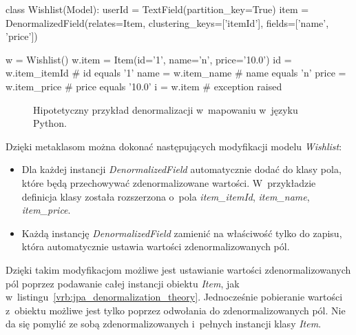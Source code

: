 \begin{verbbox}[\footnotesize]
	class Wishlist(Model):
	    userId = TextField(partition_key=True)
	    item = DenormalizedField(relates=Item, 
	                             clustering_keys=['itemId'], 
	                             fields=['name', 'price'])

	w = Wishlist()
	w.item = Item(id='1', name='n', price='10.0')
	id = w.item_itemId    # id equals '1'
	name = w.item_name    # name equals 'n'
	price = w.item_price  # price equals '10.0'
	i = w.item            # exception raised
\end{verbbox}

\begin{figure}[ht!]
	\centering
	\theverbbox
	\caption{Hipotetyczny przykład denormalizacji w~mapowaniu w~języku Python.}
	\label{vrb:sql_alchemy_like_denormalization}
\end{figure}

Dzięki metaklasom można dokonać następujących modyfikacji modelu \emph{Wishlist}:

\begin{itemize}
	\item Dla każdej instancji \emph{DenormalizedField} automatycznie dodać do klasy pola, które będą przechowywać zdenormalizowane wartości. W~przykładzie definicja klasy została rozszerzona o~pola \emph{item\_itemId}, \emph{item\_name}, \emph{item\_price}.
	\item Każdą instancję \emph{DenormalizedField} zamienić na właściwość tylko do zapisu, która automatycznie ustawia wartości zdenormalizowanych pól.
\end{itemize}

Dzięki takim modyfikacjom możliwe jest ustawianie wartości zdenormalizowanych pól poprzez podawanie całej instancji obiektu \emph{Item}, jak w~listingu~\ref{vrb:jpa_denormalization_theory}. Jednocześnie pobieranie wartości z~obiektu możliwe jest tylko poprzez odwołania do zdenormalizowanych pól. Nie da się pomylić ze sobą zdenormalizowanych i~pełnych instancji klasy \emph{Item}.